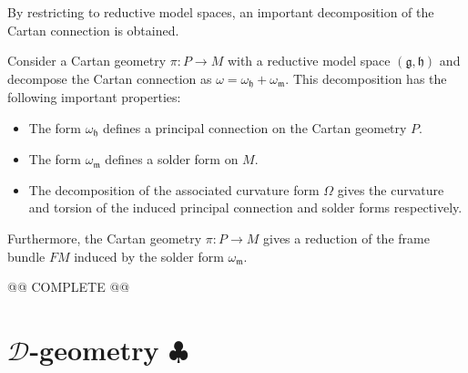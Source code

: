     By restricting to reductive model spaces, an important decomposition of the Cartan connection is obtained.
    \begin{property}
        Consider a Cartan geometry $\pi:P\rightarrow M$ with a reductive model space $(\mathfrak{g},\mathfrak{h})$ and decompose the Cartan connection as $\omega=\omega_{\mathfrak{h}}+\omega_{\mathfrak{m}}$. This decomposition has the following important properties:
        \begin{itemize}
            \item The form $\omega_{\mathfrak{h}}$ defines a principal connection on the Cartan geometry $P$.
            \item The form $\omega_{\mathfrak{m}}$ defines a solder form on $M$.
            \item The decomposition of the associated curvature form $\Omega$ gives the curvature and torsion of the induced principal connection and solder forms respectively.
        \end{itemize}
        Furthermore, the Cartan geometry $\pi:P\rightarrow M$ gives a reduction of the frame bundle $FM$ induced by the solder form $\omega_{\mathfrak{m}}$.
    \end{property}
    @@ COMPLETE @@

\section{\texorpdfstring{$\mathcal{D}$-geometry $\clubsuit$}{D-geometry}}


